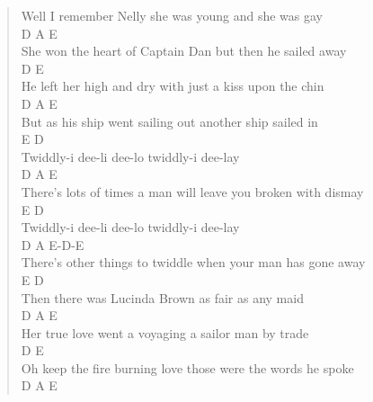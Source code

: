 \documentclass[11pt]{article}
\begin{document}
\begin{verse}
Well I remember Nelly she was young and she was gay\\
\hspace*{4em}D                                 A              E\\
She won the heart of Captain Dan but then he sailed away\\
\hspace*{4em}D                                  E\\
He left her high and dry with just a kiss upon the chin\\
\hspace*{4em}D                              A                  E\\
But as his ship went sailing out another ship sailed in\\
\vspace*{1em}
\vspace*{1em}
\vspace*{1em}
E                        D\\
Twiddly-i dee-li dee-lo twiddly-i dee-lay\\
\hspace*{9em}D                                 A           E\\
There's lots of times a man will leave you broken with dismay\\
E                         D\\
Twiddly-i dee-li dee-lo twiddly-i dee-lay\\
\hspace*{8em}D                                 A              E-D-E\\
There's other things to twiddle when your man has gone away\\
\vspace*{1em}
\vspace*{1em}
E                                D\\
Then there was Lucinda Brown as fair as any maid\\
\hspace*{4em}D                            A             E\\
Her true love went a voyaging a sailor man by trade\\
\hspace*{5em}D                                    E\\
Oh keep the fire burning love those were the words he spoke\\
\hspace*{8em}D                           A             E\\

\end{verse}
\end{document}

